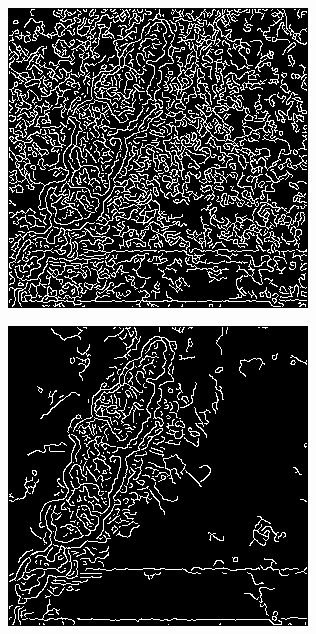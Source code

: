 \documentclass[../main.tex]{subfiles}
\begin{document}
\begin{figure}[!ht]
\begin{subfigure}{0.3\linewidth}
	\end{subfigure}\\[20pt]
	\begin{subfigure}{0.3\linewidth}
		\centering
		\includegraphics[keepaspectratio, width=\linewidth]{images/orig_edge.png}
	\end{subfigure}
	\hfill
	\begin{subfigure}{0.3\linewidth}
		\centering
		\includegraphics[keepaspectratio, width=\linewidth]{images/nlm_edge.png}

\end{subfigure}
\end{figure}
\end{document}
